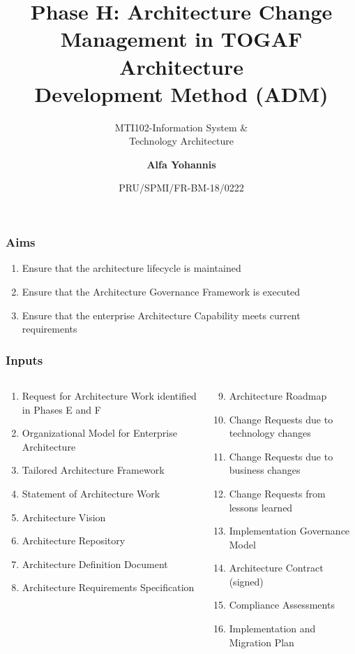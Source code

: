 \documentclass[aspectratio=169, table]{beamer}
\subtitle{MTI102-Information System \&\\Technology Architecture}
\title{\Large Phase H: Architecture Change\\Management in TOGAF
	Architecture\\Development Method (ADM)}
\date[Serial]{\scriptsize {PRU/SPMI/FR-BM-18/0222}}
\author[Pradita]{\small {\textbf{Alfa Yohannis}}}
\begin{document}
	
	\frame{\titlepage}
	
	\begin{frame}
		\frametitle{Aims}
		\begin{enumerate}
			\item Ensure that the architecture lifecycle is maintained
			\item Ensure that the Architecture Governance Framework is executed
			\item Ensure that the enterprise Architecture Capability meets current requirements
		\end{enumerate}
	\end{frame}
	
	\begin{frame}
		\frametitle{Inputs}
		\vspace{22pt}
		\begin{columns}[onlytextwidth]
			\begin{column}{0.5\textwidth}
				\begin{enumerate}
					\item Request for Architecture Work identified in Phases E and F
					\item Organizational Model for Enterprise Architecture
					\item Tailored Architecture Framework
					\item Statement of Architecture Work
					\item Architecture Vision
					\item Architecture Repository
					\item Architecture Definition Document
					\item Architecture Requirements Specification
				\end{enumerate}
				
			\end{column}
			\begin{column}{0.5\textwidth}
				\begin{enumerate}
					\setcounter{enumi}{8}
					\item Architecture Roadmap
					\item Change Requests due to technology changes
					\item Change Requests due to business changes
					\item Change Requests from lessons learned
					\item Implementation Governance Model
					\item Architecture Contract (signed)
					\item Compliance Assessments
					\item Implementation and Migration Plan
				\end{enumerate}
			\end{column}
		\end{columns}
	\end{frame}
	
\end{document}
